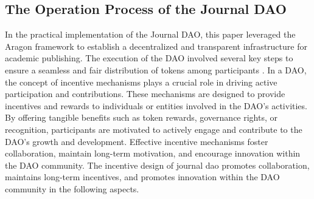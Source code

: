 \documentclass[lettersize,journal]{IEEEtran}
\begin{document}



\subsection{The Operation Process of the Journal DAO}

In the practical implementation of the Journal DAO, this paper leveraged the Aragon framework to establish a decentralized and transparent infrastructure for academic publishing. The execution of the DAO involved several key steps to ensure a seamless and fair distribution of tokens among participants \cite{el2020overview}.
In a DAO, the concept of incentive mechanisms plays a crucial role in driving active participation and contributions. These mechanisms are designed to provide incentives and rewards to individuals or entities involved in the DAO's activities. By offering tangible benefits such as token rewards, governance rights, or recognition, participants are motivated to actively engage and contribute to the DAO's growth and development. Effective incentive mechanisms foster collaboration, maintain long-term motivation, and encourage innovation within the DAO community. The incentive design of journal dao promotes collaboration, maintains long-term incentives, and promotes innovation within the DAO community in the following aspects.
\end{document}
